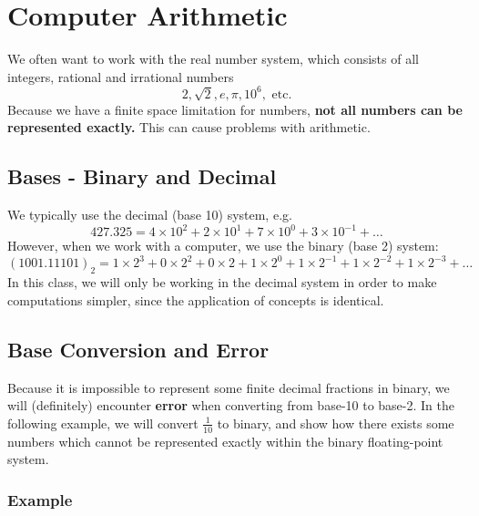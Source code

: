 \section{Computer Arithmetic}

We often want to work with the real number system, which consists of all 
integers, rational and irrational numbers
\begin{equation*}
  2, \sqrt{2}, e, \pi, 10^6, \text{ etc.} 
\end{equation*}
Because we have a finite space limitation for numbers, 
\textbf{not all numbers can be represented exactly.} This can cause problems
with arithmetic.

\subsection{Bases - Binary and Decimal}

We typically use the decimal (base 10) system, e.g.
\begin{equation*}
  427.325 = 4 \times 10^2 + 2 \times 10^1 + 7 \times 10^{0} + 3 \times 10^{-1}+\dots
\end{equation*}
However, when we work with a computer, we use the binary (base 2) system:
\begin{equation*}
  (1001.11101)_2 = 1\times 2^3 + 0\times 2^2 + 0\times 2 + 1\times 2^0 + 1\times 2^{-1} + 1\times 2^{-2} + 1\times 2^{-3} +\dots
\end{equation*}
In this class, we will only be working in the decimal system in order to make
computations simpler, since the application of concepts is identical.

\subsection{Base Conversion and Error}

Because it is impossible to represent some finite decimal fractions in binary,
we will (definitely) encounter \textbf{error} when converting from base-10 to
base-2. In the following example, we will convert $\frac{1}{10}$ to binary, and
show how there exists some numbers which cannot be represented exactly within 
the binary floating-point system.


\subsubsection{Example}

